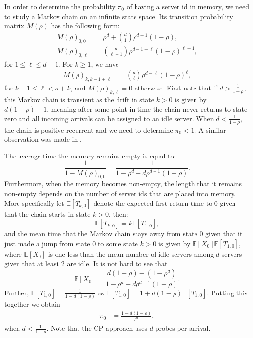 \documentclass[12pt]{report}
\newcommand{\E}{\mathbb{E}}
\begin{document}
In order to determine the probability $\pi_0$ of having a server id in memory,
we need to study a Markov chain on an infinite state space.
Its transition probability matrix $M(\rho)$ has the following form:
\begin{align*}
M(\rho)_{0,0}&= \rho^d + \binom{d}{1} \rho^{d-1} (1-\rho),\\
M(\rho)_{0,\ell}&= \binom{d}{\ell+1} \rho^{d-1-\ell} (1-\rho)^{\ell+1},
\end{align*}
for $1\leq \ell \leq d-1$. For $k\geq 1$, we have 
\begin{align*}
M(\rho)_{k,k-1+\ell}
&=\binom{d}{\ell} \rho^{d-\ell} (1-\rho)^{\ell},
\end{align*}
for $k-1\leq \ell <d+k$, and $M(\rho)_{k,\ell}=0$ otherwise.
First note that if $d>\frac{1}{1-\rho}$, this Markov chain is transient
as the drift in state $k > 0$ is given by $d(1-\rho)-1$,
meaning after some point in time the chain never returns to state zero and all
incoming arrivals can be assigned to an idle server.
When $d < \frac{1}{1-\rho}$, the chain is positive recurrent and we need to 
determine $\pi_0 < 1$. A similar observation was made in \cite{van2019hyper, anselmi2020power}.

The average time the memory remains empty is equal to:
$$
\frac{1}{1-M(\rho)_{0,0}}=\frac{1}{1- \rho^d - d \rho^{d-1} (1-\rho)}.
$$
Furthermore, when the memory becomes non-empty, the length that it remains non-empty
depends on the number of server ids that are placed into memory. More specifically let $\E[T_{k,0}]$ denote 
the expected first return time to $0$ given that the chain starts in state $k > 0$,
then:
$$
\E[T_{k,0}] = k \E[T_{1,0}],
$$
and the mean time that the Markov chain stays away from state $0$ given that
it just made a jump from state $0$ to some state $k > 0$ is given by $\E[X_0]\E[T_{1,0}]$,
where $\E[X_0]$ is one less than the mean number of idle servers among $d$ servers given that
at least $2$ are idle. It is not hard to see that 
$$\E[X_0]=\frac{d(1-\rho)-(1-\rho^d)}{1- \rho^d - d \rho^{d-1} (1-\rho)}.$$
Further, $\E[T_{1,0}]=\frac{1}{1-d(1-\rho)}$ as $\E[T_{1,0}] = 1 + d(1-\rho) \E[T_{1,0}]$. 
Putting this together we obtain
\begin{align}
\pi_0&=\frac{1-d(1-\rho)}{\rho^d},\label{eq:pi_0_lots_of_mem}
\end{align}
when $d < \frac{1}{1-\rho}$.
Note that the CP approach uses $d$ probes per arrival.
\end{document}
